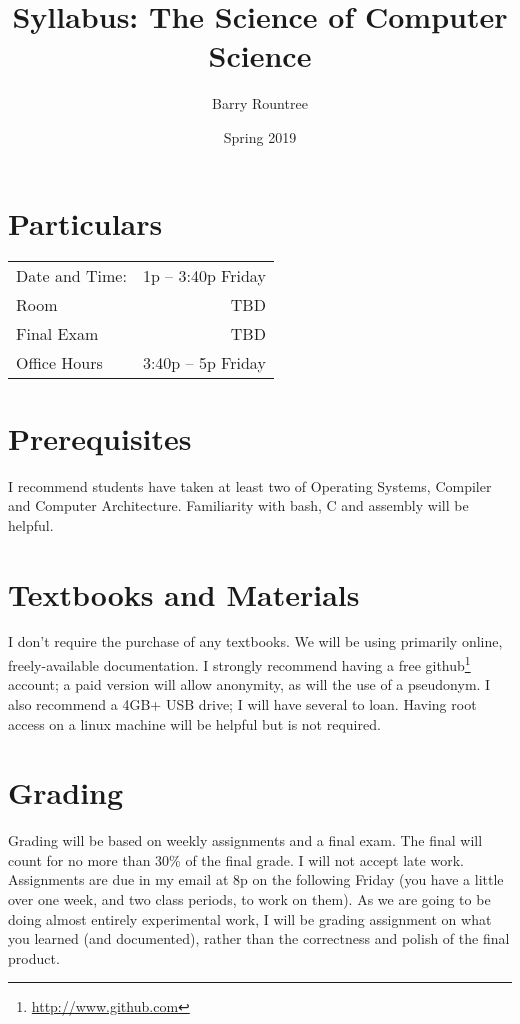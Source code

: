 \documentclass{tufte-handout}
\title{Syllabus:  The Science of Computer Science}
\author{Barry Rountree}
\date{Spring 2019}
\begin{document}
\maketitle%

\section{Particulars}
\begin{tabular*}{0.75\textwidth}{l r}
	Date and Time:  & 1p -- 3:40p Friday	\\
	Room		& TBD			\\
	Final Exam	& TBD			\\
	Office Hours	& 3:40p -- 5p Friday	\\
\end{tabular*}

\section{Prerequisites}
I recommend students have taken at least two of Operating Systems, Compiler and
Computer Architecture.  Familiarity with bash, C and assembly will be helpful.

\section{Textbooks and Materials}
I don't require the purchase of any textbooks.  We will be using primarily online,
freely-available documentation.  I strongly recommend having a free 
github\footnote{\url{http://www.github.com}} account;
a paid version will allow anonymity, as will the use of a pseudonym.  I also 
recommend a 4GB+ USB drive; I will have several to loan.  Having root access on a 
linux machine will be helpful but is not required.

\section{Grading}
Grading will be based on weekly assignments and a final exam.  The final will count
for no more than 30\% of the final grade.  I will not accept late work.  Assignments
are due in my email at 8p on the following Friday (you have a little over one week,
and two class periods, to work on them).  As we are going to be doing almost entirely
experimental work, I will be grading assignment on what you learned (and documented),
rather than the correctness and polish of the final product.
\end{document}
